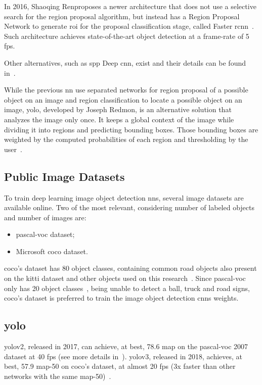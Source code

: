 In 2016, Shaoqing Ren\etal proposes a newer architecture that does not use a selective search for the region proposal algorithm, but instead has a Region Proposal Network to generate \ac{roi} for the proposal classification stage, called Faster \ac{rcnn}~\cite{Ren2017}. Such architecture achieves state-of-the-art object detection at a frame-rate of 5 \ac{fps}. 

Other alternatives, such as \ac{spp} Deep \ac{cnn}, exist and their details can be found in~\cite{He2015}.

While the previous \ac{nn} use separated networks for region proposal of a possible object on an image and region classification to locate a possible object on an image, \acf{yolo}, developed by Joseph Redmon, is an alternative solution that analyzes the image only once. It keeps a global context of the image while dividing it into regions and predicting bounding boxes. Those bounding boxes are weighted by the computed probabilities of each region and thresholding by the user~\cite{Redmon2016}. 

\subsection{Public Image Datasets}
To train deep learning image object detection \acp{nn}, several image datasets are available online. Two of the most relevant, considering number of labeled objects and number of images are:

\begin{itemize}
	\item \ac{pascal-voc} dataset;
	\item Microsoft \acf{coco} dataset.
\end{itemize}

\ac{coco}'s dataset has 80 object classes, containing common road objects also present on the \ac{kitti} dataset and other objects used on this research~\cite{Lin2014a}. Since \ac{pascal-voc} only has 20 object classes~\cite{Everingham2010}, being unable to detect a ball, truck and road signs, \ac{coco}'s dataset is preferred to train the image object detection \acp{cnn} weights.

\subsection{\ac{yolo}}
\ac{yolo}v2, released in 2017, can achieve, at best, 78.6 \ac{map} on the \ac{pascal-voc} 2007 dataset at 40 \ac{fps} (see more details in~\cite{Redmon2017}). \ac{yolo}v3, released in 2018, achieves, at best, 57.9 \ac{map}-50 on \ac{coco}'s dataset, at almost 20 \ac{fps} (3x faster than other networks with the same \ac{map}-50)~\cite{Redmon2018}.

